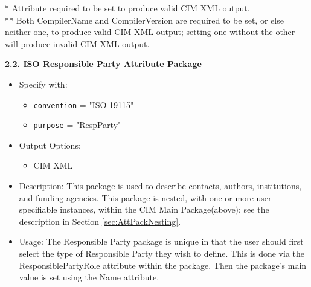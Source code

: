* Attribute required to be set to produce valid CIM XML output. \\
** Both CompilerName and CompilerVersion are required to be set, or else neither one, to produce valid CIM XML output; setting one without the other will produce invalid CIM XML output.

\vspace{.20in}

{\bf 2.2. ISO Responsible Party Attribute Package}

\begin{itemize}
    \item Specify with:
    \begin{itemize}
        \item {\tt convention} = "ISO 19115"
        \item {\tt purpose} = "RespParty"
    \end{itemize}
    \item Output Options:
    \begin{itemize}
        \item CIM XML
    \end{itemize}
    \item Description: This package is used to describe contacts, authors, institutions, and funding agencies. This package is nested, with one or more user-specifiable instances, within the CIM Main Package(above); see the description in Section \ref{sec:AttPackNesting}.
    \item Usage: The Responsible Party package is unique in that the user should first select the type of Responsible Party they wish to define. This is done via the ResponsiblePartyRole attribute within the package. Then the package's main value is set using the Name attribute.
\end{itemize}


